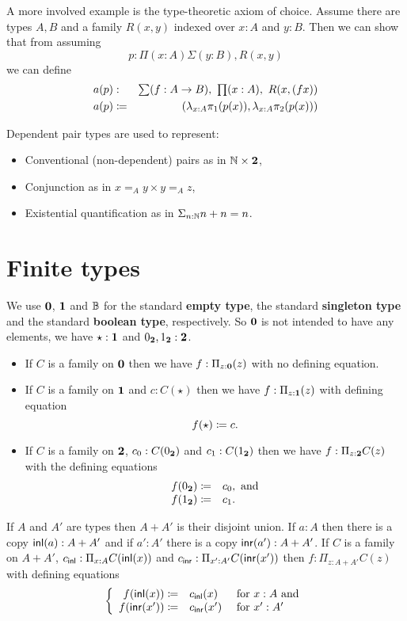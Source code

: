 A more involved example is the type-theoretic axiom of choice. Assume
there are types $A,B$ and a family $R(x,y)$ indexed over $x:A$ and
$y:B$. Then we can show that from assuming 
\[p : \Pi(x:A)\Sigma(y :B),R(x,y)\] 
we can define 
\begin{eqnarray*}
a(p) & : & \sm{f : A \to B} \prd{x:A} R(x,(fx)) \\
a(p) & \defeq & (\lambda_{x:A} \pi_1(p(x)),\lambda_{x:A} \pi_2(p(x)))
\end{eqnarray*}

Dependent pair types are used to represent:
\begin{itemize}
\item Conventional (non-dependent) pairs as in $\mathbb{N} \times \mathbf{2}$,
\item Conjunction as in $x =_A y \times y =_A z$,
\item Existential quantification as in $\Sigma_{n:\mathbb{N}}n+n = n$.
\end{itemize}

\section{Finite types}
\label{sec:finite-types}

We use $\mathbf{0}$, $\mathbf{1}$ and $\mathbb{B}$ for the standard {\bf empty
  type}, the standard {\bf singleton type} and the standard {\bf
  boolean type}, respectively.  So $\mathbf{0}$ is not intended to have
any elements, we have $\star:\mathbf{1}$ and $0_\mathbf{2},1_\mathbf{2}:\mathbf{2}$.
\begin{itemize}
\item If $C$ is a family on $\mathbf{0}$ then we have $f:\Pi_{z:\mathbf{0}}(z)$ with no defining equation.
\item If $C$ is a family on $\mathbf{1}$ and $c:C(\star)$ then we have $f:\Pi_{z:\mathbf{1}}(z)$ with defining equation
  \[ f(\star)\coloneqq c.\]
\item If $C$ is a family on $\mathbf{2}$, $c_0:C(0_\mathbf{2})$ 
and $c_1:C(1_\mathbf{2})$ then we have $f:\Pi_{z:\mathbf{2}}C(z)$ with the defining equations
 \[ \begin{array}{rl}
f(0_\mathbf{2}) \coloneqq& c_0, \mbox{ and}\\
f(1_\mathbf{2}) \coloneqq& c_1.
  \end{array}\]
\end{itemize}

If $A$ and $A'$ are types then $A+A'$ is their disjoint union.  If
$a:A$ then there is a copy $\mathsf{inl}(a):A+A'$ and if $a':A'$ there is a
copy $\mathsf{inr}(a'):A+A'$.
If $C$ is a family on $A+A'$, $c_\mathsf{inl}:\Pi_{x:A}C(\mathsf{inl}(x))$ and $c_\mathsf{inr}:\Pi_{x':A'}C(\mathsf{inr}(x'))$ then $f:\Pi_{z:A+A'}C(z)$ with defining equations
  \[\left\{\begin{array}{rll} 
f(\mathsf{inl}(x))\coloneqq& c_\mathsf{inl}(x)&\mbox{ for } x:A \mbox{ and}\\
f(\mathsf{inr}(x'))\coloneqq& c_\mathsf{inr}(x')&\mbox{ for } x':A'\\
\end{array}\right.\]

